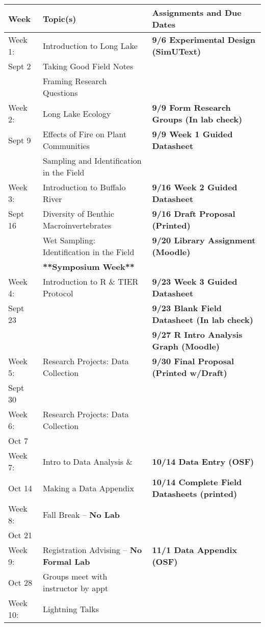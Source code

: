 \documentclass{tufte-handout}
\begin{document}
\begin{tabular}{l l l}
Week & Topic(s) & Assignments and Due Dates \\
\hline
Week 1: & Introduction to Long Lake & \textbf{9/6 Experimental Design (SimUText)} \\ 
Sept 2 & Taking Good Field Notes \\
& Framing Research Questions \\
\hline
Week 2: & Long Lake Ecology & \textbf{9/9 Form Research Groups (In lab check)} \\
Sept 9 & Effects of Fire on Plant Communities & \textbf{9/9 Week 1 Guided Datasheet}\\
& Sampling and Identification in the Field\\
\hline
Week 3: & Introduction to Buffalo River & \textbf{9/16 Week 2 Guided Datasheet} \\
Sept 16 & Diversity of Benthic Macroinvertebrates & \textbf{9/16 Draft Proposal (Printed)} \\
& Wet Sampling: Identification in the Field  & \textbf{9/20 Library Assignment (Moodle)}\\
 & \textbf{**Symposium Week**} \\
\hline
Week 4: & Introduction to R \& TIER Protocol & \textbf{9/23 Week 3 Guided Datasheet}  \\
Sept 23 &  & \textbf{9/23 Blank Field Datasheet (In lab check)} \\
 & &  \textbf{9/27 R Intro Analysis Graph (Moodle)}\\
\hline
Week 5: & Research Projects: Data Collection & \textbf{9/30 Final Proposal (Printed w/Draft)}\\
Sept 30 & & \\
\hline 
Week 6: & Research Projects: Data Collection &  \\
Oct 7 & \\
\hline 
Week 7: & Intro to Data Analysis \& &  \textbf{10/14 Data Entry (OSF)} \\
Oct 14 & Making a Data Appendix & \textbf{10/14 Complete Field Datasheets (printed)}\\
\hline
Week 8: & Fall Break -- \textbf{No Lab} & \\
Oct 21 & \\
\hline 
Week 9: & Registration Advising -- \textbf{No Formal Lab} & \textbf{11/1 Data Appendix (OSF)} \\
Oct 28 & Groups meet with instructor by appt \\
\hline 
Week 10: & Lightning Talks &  \\

\end{tabular}
\end{document}
